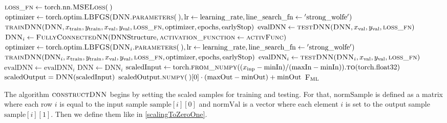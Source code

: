 \begin{algorithm}[H]
\begin{algorithmic}[1]
\State $\textproc{loss\_fn} \gets \mathrm{torch.nn.}\Call{MSELoss}{\:}$
\State $\mathrm{optimizer} \gets \mathrm{torch.optim.}\Call{LBFGS}{\protect\Call{DNN.parameters}{\:}, \mathrm{lr}\gets\mathrm{learning\_rate}, \mathrm{line\_search\_fn}\gets\mathrm{'strong\_wolfe'}}$
\State $\Call{trainDNN}{\textproc{DNN}, x_\mathrm{train}, y_\mathrm{train}, x_\mathrm{val}, y_\mathrm{val}, \textproc{loss\_fn}, \mathrm{optimizer}, \mathrm{epochs}, \mathrm{earlyStop}}$
\State\label{defEvalDNN} $\mathrm{evalDNN} \gets \Call{testDNN}{\textproc{DNN}, x_\mathrm{val}, y_\mathrm{val}, \textproc{loss\_fn}}$
\State $\textproc{DNN}_i \gets \Call{FullyConnectedNN}{\mathrm{DNNStructure}, \textproc{activation\_function}\gets\textproc{activFunc}}$
\State $\mathrm{optimizer} \gets \mathrm{torch.optim.}\Call{LBFGS}{\protect\Call{DNN$_i$.parameters}{\:}, \mathrm{lr}\gets\mathrm{learning\_rate}, \mathrm{line\_search\_fn}\gets\mathrm{'strong\_wolfe'}}$
\State $\Call{trainDNN}{\mathrm{DNN}_i, x_\mathrm{train}, y_\mathrm{train}, x_\mathrm{val}, y_\mathrm{val}, \textproc{loss\_fn}, \mathrm{optimizer}, \mathrm{epochs}, \mathrm{earlyStop}}$
\State $\mathrm{evalDNN}_i \gets \Call{testDNN}{\textproc{DNN}_i, x_\mathrm{val}, y_\mathrm{val}, \textproc{loss\_fn}}$
\State $\mathrm{evalDNN} \gets \mathrm{evalDNN}_i$
\State $\mathrm{DNN} \gets \mathrm{DNN}_i$
\EndIf
\EndFor
\State $\mathrm{scaledInput} \gets \mathrm{torch.}\Call{from\_numpy}{(x_\mathrm{inp}-\mathrm{minIn})/(\mathrm{maxIn}-\mathrm{minIn})}.\Call{to}{\mathrm{torch.float32}}$
\State $\mathrm{scaledOutput} = \Call{DNN}{\mathrm{scaledInput}}$
\State \Return $\mathrm{scaledOutput.}\Call{numpy}{\:}[0]\cdot(\mathrm{maxOut}-\mathrm{minOut})+\mathrm{minOut}$
\EndFunction
\State \Return $\textproc{F$_\mathrm{ML}$}$
\EndFunction
\end{algorithmic}
\end{algorithm}

The algorithm $\textproc{constructDNN}$ begins by setting the scaled samples for training and testing. For that, $\mathrm{normSample}$ is defined as a matrix where each row $i$ is equal to the input sample $\mathrm{sample}[i][0]$ and $\mathrm{normVal}$ is a vector where each element $i$ is set to the output sample $\mathrm{sample}[i][1]$. Then we define them like in \eqref{scalingToZeroOne}.

